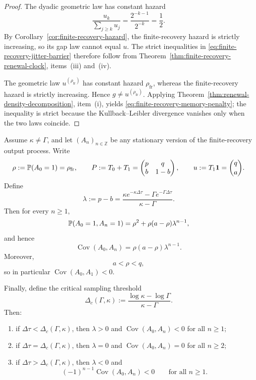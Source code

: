 \begin{proof}
The dyadic geometric law has constant hazard
\[
\frac{u_k}{\sum_{j\ge k}u_j}
=
\frac{2^{-k-1}}{2^{-k}}
=
\frac12.
\]
By Corollary~\ref{cor:finite-recovery-hazard}, the finite-recovery hazard is strictly increasing, so its gap law cannot equal $u$. The strict inequalities in \eqref{eq:finite-recovery-jitter-barrier} therefore follow from Theorem~\ref{thm:finite-recovery-renewal-clock}, items~(iii) and~(iv).

The geometric law $u^{(\rho_{\mathrm{fr}})}$ has constant hazard $\rho_{\mathrm{fr}}$, whereas the finite-recovery hazard is strictly increasing. Hence $g\neq u^{(\rho_{\mathrm{fr}})}$. Applying Theorem~\ref{thm:renewal-density-decomposition}, item~(i), yields \eqref{eq:finite-recovery-memory-penalty}; the inequality is strict because the Kullback--Leibler divergence vanishes only when the two laws coincide.
\end{proof}

\begin{theorem}\label{thm:finite-recovery-correlation}
Assume $\kappa\neq\Gamma$, and let $(A_n)_{n\in\mathbb Z}$ be any stationary version of the finite-recovery output process. Write
\[
\rho:=\mathbb{P}(A_0=1)=\rho_{\mathrm{fr}},
\qquad
P:=T_0+T_1=
\begin{pmatrix}
p&q\\
b&1-b
\end{pmatrix},
\qquad
u:=T_1\mathbf 1=
\binom{q}{a}.
\]
Define
\begin{equation}\label{eq:finite-recovery-lambda}
\lambda:=p-b
=
\frac{\kappa e^{-\kappa\Delta\tau}-\Gamma e^{-\Gamma\Delta\tau}}{\kappa-\Gamma}.
\end{equation}
Then for every $n\ge 1$,
\begin{equation}\label{eq:finite-recovery-twopoint}
\mathbb{P}(A_0=1,A_n=1)
=
\rho^2+\rho(a-\rho)\lambda^{n-1},
\end{equation}
and hence
\begin{equation}\label{eq:finite-recovery-covariance}
\operatorname{Cov}(A_0,A_n)
=
\rho(a-\rho)\lambda^{n-1}.
\end{equation}
Moreover,
\begin{equation}\label{eq:finite-recovery-rho-sandwich}
a<\rho<q,
\end{equation}
so in particular $\operatorname{Cov}(A_0,A_1)<0$.

Finally, define the critical sampling threshold
\[
\Delta_c(\Gamma,\kappa):=\frac{\log\kappa-\log\Gamma}{\kappa-\Gamma}.
\]
Then:
\begin{enumerate}[label=(\roman*),leftmargin=*,itemsep=2pt]
  \item if $\Delta\tau<\Delta_c(\Gamma,\kappa)$, then $\lambda>0$ and $\operatorname{Cov}(A_0,A_n)<0$ for all $n\ge 1$;
  \item if $\Delta\tau=\Delta_c(\Gamma,\kappa)$, then $\lambda=0$ and $\operatorname{Cov}(A_0,A_n)=0$ for all $n\ge 2$;
  \item if $\Delta\tau>\Delta_c(\Gamma,\kappa)$, then $\lambda<0$ and
  \[
  (-1)^{n-1}\operatorname{Cov}(A_0,A_n)<0
  \qquad\text{for all }n\ge 1.
  \]
\end{enumerate}
\end{theorem}


